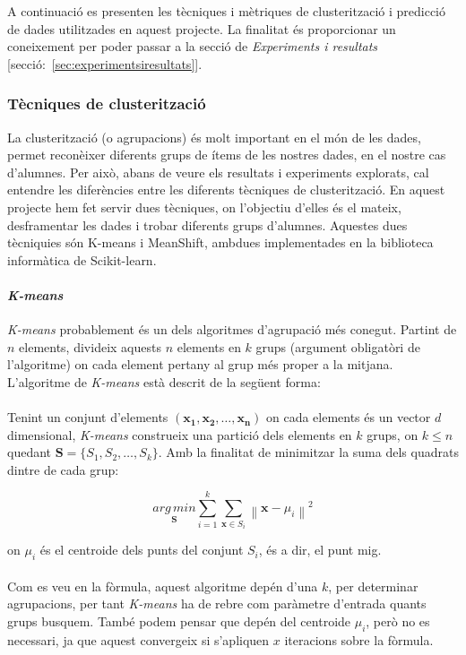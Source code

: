 \documentclass[12pt,a4paper,catalan]{article}
\begin{document}
A continuació es presenten les tècniques i mètriques de clusterització i predicció de dades utilitzades en aquest projecte. La finalitat és proporcionar un coneixement per poder passar a la secció de \textit{Experiments i resultats} [secció:~\ref{sec:experimentsiresultats}].

\subsubsection{Tècniques de clusterització}
La clusterització (o agrupacions) és molt important en el món de les dades, permet reconèixer diferents grups de ítems de les nostres dades, en el nostre cas d'alumnes. Per això, abans de veure els resultats i experiments explorats, cal entendre les diferències entre les diferents tècniques de clusterització. En aquest projecte hem fet servir dues tècniques, on l'objectiu d'elles és el mateix, desframentar les dades i trobar diferents grups d'alumnes. Aquestes dues tècniquies són K-means i MeanShift, ambdues implementades en la biblioteca informàtica de Scikit-learn.

\paragraph{\textit{K-means}}
\textit{K-means} \cite{k-means} probablement és un dels algoritmes d'agrupació més conegut. Partint de $n$ elements, divideix aquests $n$ elements en $k$ grups (argument obligatòri de l'algoritme) on cada element pertany al grup més proper a la mitjana. L'algoritme de \textit{K-means} està descrit de la següent forma:
\\
\\
Tenint un conjunt d'elements $\mathbf{(x_1, x_2, \ldots, x_n)}$ on cada elements és un vector $d$ dimensional, \textit{K-means} construeix una partició dels elements en $k$ grups, on $k \leq n$ quedant $\mathbf{S} = \{S_1, S_2, \ldots, S_k\}$. Amb la finalitat de minimitzar la suma dels quadrats dintre de cada grup:

$$ \underset{\mathbf{S}} {arg\,min} \sum_{i=1}^{k} \sum_{\mathbf{x} \in S_i} \left\| \mathbf{x} - \mu_i \right\|^2 $$

on $\mu_i$ és el centroide dels punts del conjunt $S_i$, és a dir, el punt mig.
\\
\\
Com es veu en la fòrmula, aquest algoritme depén d'una $k$, per determinar agrupacions, per tant \textit{K-means} ha de rebre com paràmetre d'entrada quants grups busquem. També podem pensar que depén del centroide $\mu_i$, però no es necessari, ja que aquest convergeix si s'apliquen $x$ iteracions sobre la fòrmula.
\end{document}
